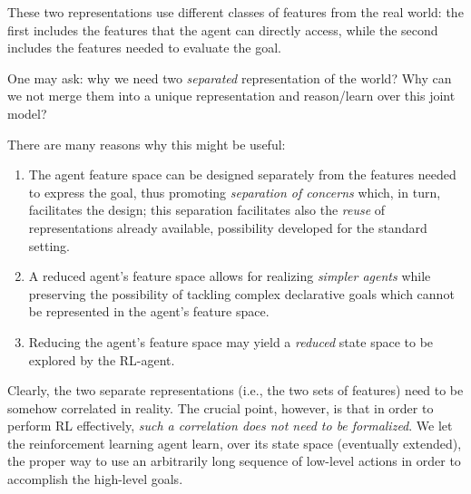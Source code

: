 These two representations use different classes of features
from the real world: the first includes the features that the agent can directly access, while the second includes the features needed to evaluate the \LLf goal.

One may ask: why we need two \emph{separated} representation of the world? Why can we not merge them into a unique representation and reason/learn over this joint model?

There are many reasons why this might be useful:
\begin{enumerate}
	\item The agent feature space can be designed separately from
	the features needed to express the goal, thus promoting
	\emph{separation of concerns} which, in turn, facilitates the design; this separation facilitates also the \emph{reuse} of representations already available, possibility developed for the standard setting.\label{motivation:separation-of-concern}
	
	\item A reduced agent's feature space allows for realizing \emph{simpler agents} while preserving the possibility of tackling complex declarative goals which cannot be represented in the agent's feature space. \label{motivation:simpler-agent}
	
	\item Reducing the agent's feature space may yield a \emph{reduced} state space to be explored by the RL-agent.\label{motivation:reduced-space}
	
\end{enumerate}

Clearly, the two separate representations (i.e., the two sets
of features) need to be somehow correlated in reality. The crucial point, however, is that in order to perform RL effectively, \emph{such a correlation does not need to be formalized}. We let the reinforcement learning agent learn, over its state space (eventually extended), the proper way to use an arbitrarily long sequence of low-level actions in order to accomplish the high-level goals.


